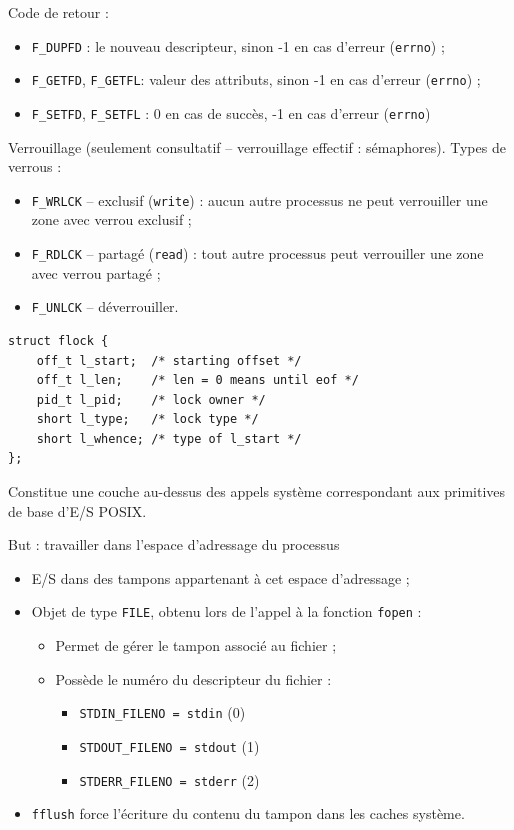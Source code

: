 \documentclass[french]{scrartcl}
\begin{document}
\begin{multicols}{3}
\begin{itemize}
\begin{itemize}
	\end{itemize}
\end{itemize}
Code de retour :\begin{itemize}
	\item \lstinline!F_DUPFD! : le nouveau descripteur, sinon -1 en cas d'erreur (\lstinline!errno!) ;
	\item \lstinline!F_GETFD!, \lstinline!F_GETFL!: valeur des attributs, sinon -1 en cas d'erreur (\lstinline!errno!) ;
	\item \lstinline!F_SETFD!, \lstinline!F_SETFL! : 0 en cas de succès, -1 en cas d'erreur (\lstinline!errno!)
\end{itemize}
Verrouillage (seulement consultatif -- verrouillage effectif : sémaphores). Types de verrous :\begin{itemize}
	\item \lstinline!F_WRLCK! -- exclusif (\lstinline!write!) : aucun autre processus ne peut verrouiller une zone avec verrou exclusif ;
	\item \lstinline!F_RDLCK! -- partagé (\lstinline!read!) : tout autre processus peut verrouiller une zone avec verrou partagé ;
	\item \lstinline!F_UNLCK! -- déverrouiller.
\end{itemize}
\vspace{-7pt}\begin{lstlisting}
struct flock {
	off_t l_start;	/* starting offset */
	off_t l_len; 	/* len = 0 means until eof */
	pid_t l_pid; 	/* lock owner */
	short l_type; 	/* lock type */
	short l_whence; /* type of l_start */
};
\end{lstlisting}\vspace{-7pt}

\clearpage
{}
Constitue une couche au-dessus des appels système correspondant aux primitives de base d’E/S POSIX.

But : travailler dans l'espace d'adressage du processus
\begin{itemize}
	\item E/S dans des tampons appartenant à cet espace d'adressage ;
	\item Objet de type \lstinline!FILE!, obtenu lors de l'appel à la fonction \lstinline!fopen! :\begin{itemize}
		\item Permet de gérer le tampon associé au fichier ;
		\item Possède le numéro du descripteur du fichier :\begin{itemize}
			\item \lstinline!STDIN_FILENO = stdin! (0)
			\item \lstinline!STDOUT_FILENO = stdout! (1)
			\item \lstinline!STDERR_FILENO = stderr! (2)
		\end{itemize}
	\end{itemize}
	\item \lstinline!fflush! force l'écriture du contenu du tampon dans les caches système.
\end{itemize}


\end{multicols}
\end{document}
